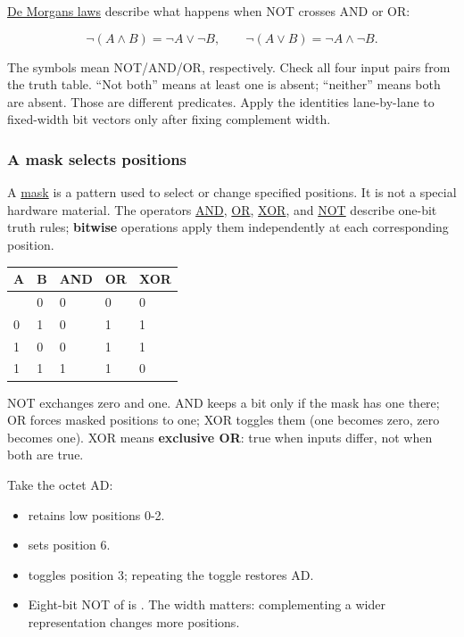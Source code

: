 \hyperref[appendix-9079d3659da4]{De Morgan\textquotesingle s laws} describe what happens when NOT crosses AND or OR:

\[
\neg(A\land B)=\neg A\lor\neg B,\qquad
\neg(A\lor B)=\neg A\land\neg B.
\]

The symbols mean NOT/AND/OR, respectively. Check all four input pairs from the truth table. ``Not both'' means at least one is absent; ``neither'' means both are absent. Those are different predicates. Apply the identities lane-by-lane to fixed-width bit vectors only after fixing complement width.

\subsubsection{A mask selects positions}\label{01-foundations-i-ch001-a-mask-selects-positions}

\hypertarget{01-foundations-i-ch001-a-mask-selects-positions}{}

A \hyperref[appendix-dbe5905163c2]{mask} is a pattern used to select or change specified positions. It is not a special hardware material. The operators \hyperref[appendix-68b52453737c]{AND}, \hyperref[appendix-a427ce8ce8a6]{OR}, \hyperref[appendix-d49161831368]{XOR}, and \hyperref[appendix-8f38927cfc54]{NOT} describe one-bit truth rules; \textbf{bitwise} operations apply them independently at each corresponding position.

{\def\LTcaptype{none} %
\begin{longtable}[]{@{}lllll@{}}
\toprule\noalign{}
A & B & AND & OR & XOR \\
\midrule\noalign{}
\endhead
\bottomrule\noalign{}
\endlastfoot
0 & 0 & 0 & 0 & 0 \\
0 & 1 & 0 & 1 & 1 \\
1 & 0 & 0 & 1 & 1 \\
1 & 1 & 1 & 1 & 0 \\
\end{longtable}
}

NOT exchanges zero and one. AND keeps a bit only if the mask has one there; OR forces masked positions to one; XOR toggles them (one becomes zero, zero becomes one). XOR means \textbf{exclusive OR}: true when inputs differ, not when both are true.

Take the octet AD:

\begin{itemize}
\tightlist
\item
   retains low positions 0-2.
\item
   sets position 6.
\item
   toggles position 3; repeating the toggle restores AD.
\item
  Eight-bit NOT of  is . The width matters: complementing a wider representation changes more positions.
\end{itemize}

